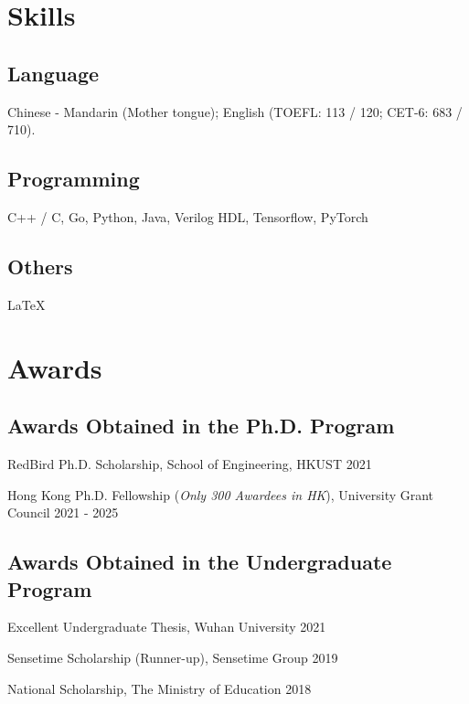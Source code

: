 \documentclass[12pt,letterpaper]{report}
\begin{document}
\section*{Skills}

\subsection*{Language}

Chinese - Mandarin (Mother tongue); English (TOEFL: 113 / 120; CET-6: 683 / 710).

\vspace{-0.5em}
\subsection*{Programming}

C++ / C, Go, Python, Java, Verilog HDL, Tensorflow, PyTorch

\vspace{-0.5em}
\subsection*{Others}

LaTeX

\section*{Awards}

\subsection*{Awards Obtained in the Ph.D. Program}

RedBird Ph.D. Scholarship, School of Engineering, HKUST \hfill{2021}

Hong Kong Ph.D. Fellowship (\textit{Only 300 Awardees in HK}), University Grant Council \hfill{2021 - 2025}

\vspace{-0.5em}
\subsection*{Awards Obtained in the Undergraduate Program}

Excellent Undergraduate Thesis, Wuhan University \hfill{2021}

Sensetime Scholarship (Runner-up), Sensetime Group \hfill{2019}

National Scholarship, The Ministry of Education \hfill{2018}
\end{document}
